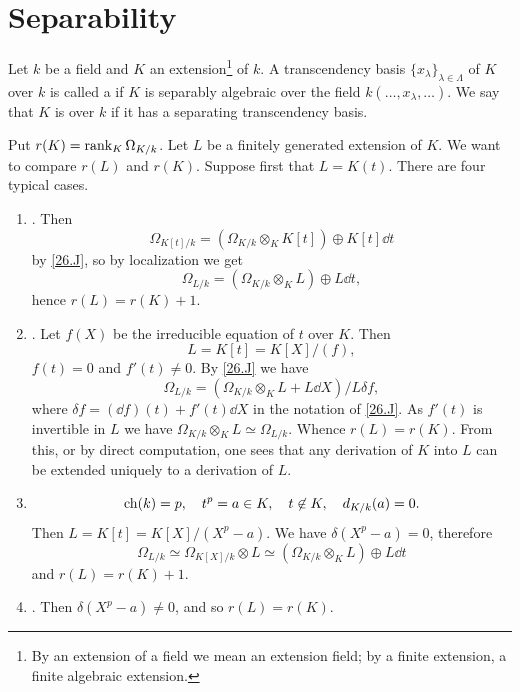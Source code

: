 \documentclass[../main]{subfiles}
\begin{document}
\section{Separability}\label{sec:27}

\newparagraph Let $k$ be a field and $K$ an extension\footnote{By an extension of a field we mean an extension field; by a finite extension, a finite algebraic extension.} of $k$. A transcendency basis $\{x_\lambda\}_{\lambda \in \Lambda}$ of $K$ over $k$ is called a  if $K$ is separably algebraic over the field $k(\ldots, x_\lambda, \ldots)$. We say that $K$ is  over $k$ if it has a separating transcendency basis.

Put $r(K) = \operatorname{rank}_K \Omega_{K/k}$. Let $L$ be a finitely generated extension of $K$. We want to compare $r(L)$ and $r(K)$. Suppose first that $L = K(t)$. There are four typical cases.
\begin{enumerate}[label = Case \arabic*.]
    \item {}. Then \[\Omega_{K[t]/k} = (\Omega_{K/k} \otimes_K K[t]) \oplus K[t] \dd t\] by \ref{26.J}, so by localization we get \[\Omega_{L/k} = (\Omega_{K/k} \otimes_K L) \oplus L \dd t,\] hence $r(L) = r(K) + 1$.
    \item {}. Let $f(X)$ be the irreducible equation of $t$ over $K$. Then \[L = K[t] = K[X]/(f),\] $f(t) = 0$ and $f'(t) \ne 0$. By \ref{26.J} we have \[\Omega_{L/k} = (\Omega_{K/k} \otimes_K L + L \dd X)/L \delta f,\] where $\delta f = (\dd f)(t) + f'(t) \dd X$ in the notation of \ref{26.J}. As $f'(t)$ is invertible in $L$ we have $\Omega_{K/k} \otimes_K L \simeq \Omega_{L/k}$. Whence $r(L) = r(K)$. From this, or by direct computation, one sees that any derivation of $K$ into $L$ can be extended uniquely to a derivation of $L$.
    \item \[\operatorname{ch}(k) = p,\quad t^p = a \in K,\quad t \not \in K,\quad d_{K/k}(a) = 0.\] Then $L = K[t] = K[X]/(X^p - a)$. We have $\delta(X^p - a) = 0$, therefore \[\Omega_{L/k} \simeq \Omega_{K[X]/k} \otimes L \simeq (\Omega_{K/k} \otimes_K L) \oplus L \dd t\]and $r(L) = r(K) + 1$.
    \item {}. Then \newline $\delta(X^p - a) \ne 0$, and so $r(L) = r(K)$.
\end{enumerate}
\end{document}
